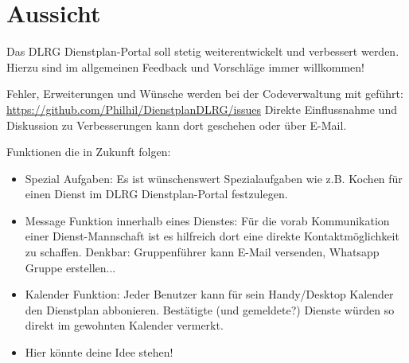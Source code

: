 \chapter{Aussicht}
\label{cha:aussicht}
Das DLRG Dienstplan-Portal soll stetig weiterentwickelt und verbessert werden. Hierzu sind im allgemeinen Feedback und Vorschläge immer willkommen!

\vspace*{5mm} \noindent Fehler, Erweiterungen und Wünsche werden bei der Codeverwaltung mit geführt: \url{https://github.com/Philhil/DienstplanDLRG/issues}
Direkte Einflussnahme und Diskussion zu Verbesserungen kann dort geschehen oder über E-Mail.

\vspace*{5mm} \noindent Funktionen die in Zukunft folgen:

\begin{itemize}
\item Spezial Aufgaben: Es ist wünschenswert Spezialaufgaben wie z.B. Kochen für einen Dienst im DLRG Dienstplan-Portal festzulegen. 
\item Message Funktion innerhalb eines Dienstes: Für die vorab Kommunikation einer Dienst-Mannschaft ist es hilfreich dort eine direkte Kontaktmöglichkeit zu schaffen. Denkbar: Gruppenführer kann E-Mail versenden, Whatsapp Gruppe erstellen...
\item Kalender Funktion: Jeder Benutzer kann für sein Handy/Desktop Kalender den Dienstplan abbonieren. Bestätigte (und gemeldete?) Dienste würden so direkt im gewohnten Kalender vermerkt.
\item Hier könnte deine Idee stehen!
\end{itemize}